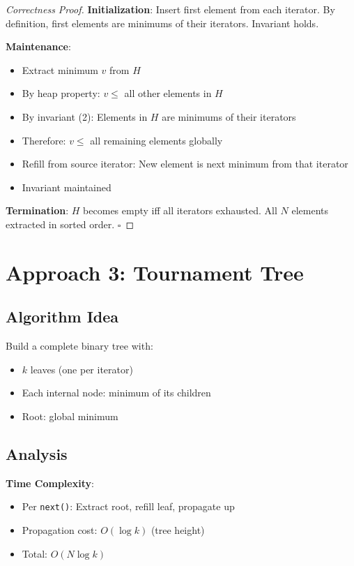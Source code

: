 \documentclass[11pt]{article}
\begin{document}
\begin{proof}[Correctness Proof]
\textbf{Initialization}: Insert first element from each iterator. By definition, first elements are minimums of their iterators. Invariant holds.

\textbf{Maintenance}:
\begin{itemize}
    \item Extract minimum $v$ from $H$
    \item By heap property: $v \leq $ all other elements in $H$
    \item By invariant (2): Elements in $H$ are minimums of their iterators
    \item Therefore: $v \leq $ all remaining elements globally
    \item Refill from source iterator: New element is next minimum from that iterator
    \item Invariant maintained
\end{itemize}

\textbf{Termination}: $H$ becomes empty iff all iterators exhausted. All $N$ elements extracted in sorted order. $\square$
\end{proof}

\section{Approach 3: Tournament Tree}

\subsection{Algorithm Idea}

Build a complete binary tree with:
\begin{itemize}
    \item $k$ leaves (one per iterator)
    \item Each internal node: minimum of its children
    \item Root: global minimum
\end{itemize}

\subsection{Analysis}

\textbf{Time Complexity}:
\begin{itemize}
    \item Per \texttt{next()}: Extract root, refill leaf, propagate up
    \item Propagation cost: $O(\log k)$ (tree height)
    \item Total: $O(N \log k)$
\end{itemize}
\end{document}
